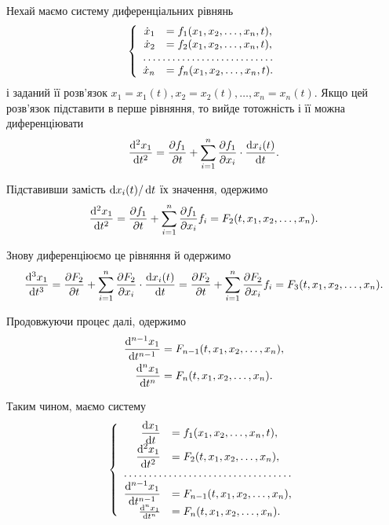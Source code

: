 Нехай маємо систему диференціальних рівнянь
\begin{equation*}
	\left\{
		\begin{array}{rl}
			\dot x_1 &= f_1 (x_1, x_2, \ldots, x_n, t), \\
			\dot x_2 &= f_2 (x_1, x_2, \ldots, x_n, t), \\
			\hdotsfor{2} \\
			\dot x_n &= f_n (x_1, x_2, \ldots, x_n, t).
		\end{array}
	\right.
\end{equation*}
і заданий її розв'язок $x_1 = x_1(t), x_2 = x_2(t), \ldots, x_n = x_n(t)$. Якщо цей розв'язок підставити в перше рівняння, то вийде тотожність і її можна диференціювати
\begin{equation*}
	\frac{\mathop{}\!\mathrm{d}^2 x_1}{\mathop{}\!\mathrm{d} t^2} = \frac{\partial f_1}{\partial t} + \sum_{i = 1}^n \frac{\partial f_1}{\partial x_i} \cdot \frac{\mathop{}\!\mathrm{d} x_i(t)}{\mathop{}\!\mathrm{d} t}.
\end{equation*}

Підставивши замість $\mathop{}\!\mathrm{d} x_i(t) /\mathop{}\!\mathrm{d} t$ їх значення, одержимо
\begin{equation*}
	\frac{\mathop{}\!\mathrm{d}^2 x_1}{\mathop{}\!\mathrm{d} t^2} = \frac{\partial f_1}{\partial t} + \sum_{i = 1}^n \frac{\partial f_1}{\partial x_i} f_i = F_2(t, x_1, x_2, \ldots, x_n).
\end{equation*}

Знову диференціюємо це рівняння й одержимо
\begin{equation*}
	\frac{\mathop{}\!\mathrm{d}^3 x_1}{\mathop{}\!\mathrm{d} t^3} = \frac{\partial F_2}{\partial t} + \sum_{i = 1}^n \frac{\partial F_2}{\partial x_i} \cdot \frac{\mathop{}\!\mathrm{d} x_i(t)}{\mathop{}\!\mathrm{d} t} = \frac{\partial F_2}{\partial t} + \sum_{i = 1}^n \frac{\partial F_2}{\partial x_i} f_i = F_3(t, x_1, x_2, \ldots, x_n).
\end{equation*}

Продовжуючи процес далі, одержимо
\begin{align*}
	\frac{\mathop{}\!\mathrm{d}^{n - 1} x_1}{\mathop{}\!\mathrm{d} t^{n - 1}} &= F_{n - 1}(t, x_1, x_2, \ldots, x_n), \\
	\frac{\mathop{}\!\mathrm{d}^n x_1}{\mathop{}\!\mathrm{d} t^n} &= F_n(t, x_1, x_2, \ldots, x_n).
\end{align*} 
 
Таким чином, маємо систему
\begin{equation*}
	\left\{
		\begin{array}{rl}
			\dfrac{\diff x_1}{\diff t} &= f_1 (x_1, x_2, \ldots, x_n, t), \\
			\dfrac{\diff^2 x_1}{\diff t^2} &= F_2(t, x_1, x_2, \ldots, x_n), \\
			\hdotsfor{2} \\
			\dfrac{\diff^{n - 1} x_1}{\diff t^{n - 1}} &= F_{n - 1}(t, x_1, x_2, \ldots, x_n), \\
			\frac{\diff^n x_1}{\diff t^n} &= F_n(t, x_1, x_2, \ldots, x_n).
		\end{array}
	\right.
\end{equation*}

